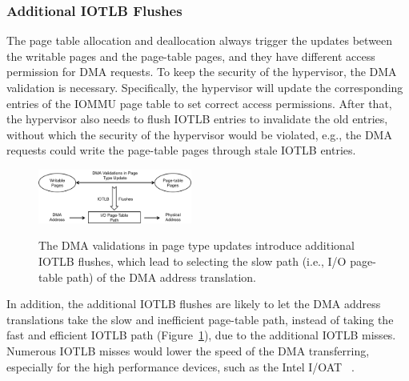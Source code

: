 \subsubsection{Additional IOTLB Flushes}
The page table allocation and deallocation always trigger the updates between the writable pages and the page-table pages, and they have different access permission for DMA requests.
To keep the security of the hypervisor, the DMA validation is necessary.
Specifically, the hypervisor will update the corresponding entries of the IOMMU page table to set correct access permissions.
After that, the hypervisor also needs to flush IOTLB entries to invalidate the old entries, without which the security of the hypervisor would be violated, e.g., the DMA requests could write the page-table pages through stale IOTLB entries.

\begin{figure}[ht]
\centering
\includegraphics[width=0.45\textwidth]{image/background/problem-illustration.png} \\
\caption{The DMA validations in page type updates introduce additional IOTLB flushes, which lead to selecting the slow path  (i.e., I/O page-table path) of the DMA address translation.}
\label{fig:pro-ill}
\end{figure}


In addition, the additional IOTLB flushes are likely to let the DMA address
translations take the slow and inefficient page-table path,
instead of taking the fast and efficient IOTLB path (Figure~\ref{fig:pro-ill}), due to the additional IOTLB misses.
Numerous IOTLB misses would lower the speed of the DMA transferring, especially for the high performance devices, such as the Intel I/OAT ~\cite{lauritzenintel}.




